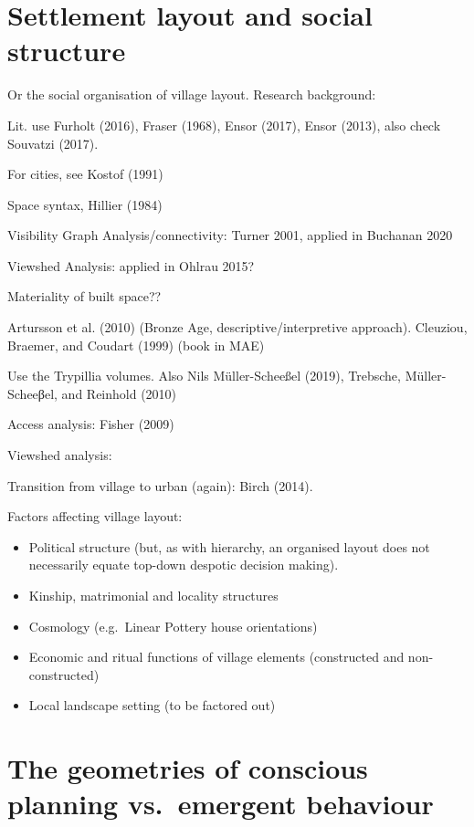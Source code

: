 \documentclass[
  12pt,
  a4paper, twoside]{book}
\begin{document}
\hypertarget{layout-ethno}{%
\section{Settlement layout and social structure}\label{layout-ethno}}

Or the social organisation of village layout. Research background:

Lit. use Furholt (2016), Fraser (1968), Ensor (2017), Ensor (2013), also check Souvatzi (2017).

For cities, see Kostof (1991)

Space syntax, Hillier (1984)

Visibility Graph Analysis/connectivity: Turner 2001, applied in Buchanan 2020

Viewshed Analysis: applied in Ohlrau 2015?

Materiality of built space??

Artursson et al. (2010) (Bronze Age, descriptive/interpretive approach). Cleuziou, Braemer, and Coudart (1999) (book in MAE)

Use the Trypillia volumes. Also Nils Müller-Scheeßel (2019), Trebsche, Müller-Scheeβel, and Reinhold (2010)

Access analysis: Fisher (2009)

Viewshed analysis:

Transition from village to urban (again): Birch (2014).

Factors affecting village layout:

\begin{itemize}
\item
  Political structure (but, as with hierarchy, an organised layout does not necessarily equate top-down despotic decision making).
\item
  Kinship, matrimonial and locality structures
\item
  Cosmology (e.g.~Linear Pottery house orientations)
\item
  Economic and ritual functions of village elements (constructed and non-constructed)
\item
  Local landscape setting (to be factored out)
\end{itemize}

\hypertarget{layouts}{%
\section{The geometries of conscious planning vs.~emergent behaviour}\label{layouts}}
\end{document}
